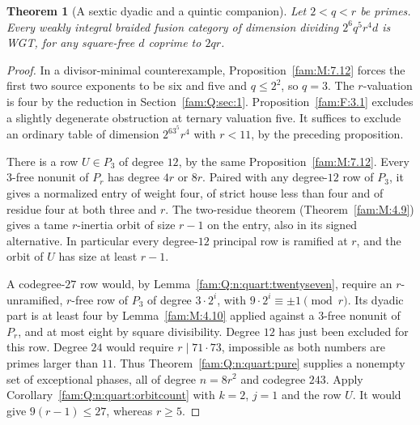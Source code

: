 \documentclass[11pt,a4paper]{article}
\numberwithin{equation}{section}
\newtheorem{theorem}{Theorem}[section]
\theoremstyle{remark}
\begin{document}
\begin{theorem}[A sextic dyadic and a quintic companion]\label{fam:Q:6.9}\label{fam:Q:n:quart:sextic}
Let $2<q<r$ be primes. Every weakly integral braided fusion category
of dimension dividing $2^6 q^5 r^4 d$ is WGT, for any square-free
$d$ coprime to $2qr$.
\end{theorem}
\begin{proof}
In a divisor-minimal counterexample, Proposition~\ref{fam:M:7.12}
forces the first two source exponents to be six and five and
$q\le 2^2$, so $q=3$. The $r$-valuation is four by the reduction
in Section~\ref{fam:Q:sec:1}. Proposition~\ref{fam:F:3.1}
excludes a slightly degenerate obstruction at ternary valuation five. It suffices to exclude an ordinary table of dimension
$2^63^5r^4$ with $r<11$, by the preceding proposition.

There is a row $U\in P_3$ of degree $12$, by the same
Proposition~\ref{fam:M:7.12}. Every $3$-free nonunit of $P_r$ has degree
$4r$ or $8r$. Paired with any degree-$12$ row of $P_3$, it gives
a normalized entry of weight four, of strict house less than four
and of residue four at both three and $r$. The two-residue theorem
(Theorem~\ref{fam:M:4.9}) gives a tame $r$-inertia orbit of size
$r-1$ on the entry, also in its signed alternative. In particular
every degree-$12$ principal row is ramified at $r$, and the orbit
of $U$ has size at least $r-1$.

A codegree-$27$ row would, by Lemma~\ref{fam:Q:n:quart:twentyseven},
require an $r$-unramified, $r$-free row of $P_3$ of degree
$3\cdot2^i$, with $9\cdot2^i\equiv\pm1\pmod r$. Its dyadic
part is at least four by Lemma~\ref{fam:M:4.10} applied against
a $3$-free nonunit of $P_r$, and at most eight by square
divisibility. Degree $12$ has just been excluded for this row.
Degree $24$ would require $r\mid 71\cdot73$, impossible as
both numbers are primes larger than $11$. Thus
Theorem~\ref{fam:Q:n:quart:pure} supplies a nonempty set of exceptional
phases, all of degree $n=8r^2$ and codegree $243$. Apply
Corollary~\ref{fam:Q:n:quart:orbitcount} with $k=2$, $j=1$ and the
row $U$. It would give $9(r-1)\le27$, whereas $r\ge5$.
\end{proof}
\end{document}
